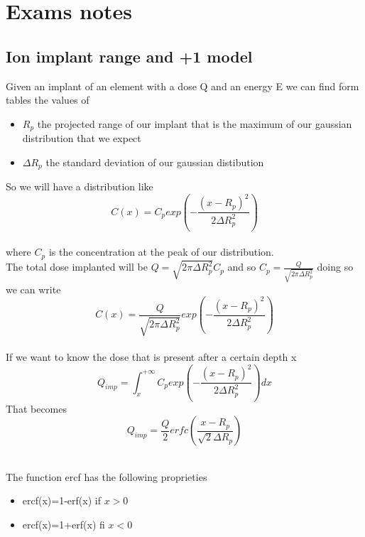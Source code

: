 \chapter{Exams notes}


\section{Ion implant range and +1 model}

Given an implant of an element with a dose Q and an energy E we can find form tables the values of 
    \begin{itemize}
    \item $R_p$ the projected range of our implant that is the maximum of our gaussian distribution that we expect
    \item $\Delta R_p$ the standard deviation of our gaussian distibution
    \end{itemize}
So we will have a distribution like 
\begin{equation}
C(x)=C_p exp\left(-\frac{(x-R_p)^2}{2\Delta R_p^2}\right)
\end{equation}
\\
where $C_p$ is the concentration at the peak of our distribution.\\
The total dose implanted will be $Q=\sqrt{2\pi\Delta R_p^2} C_p$ and so $C_p=\frac{Q}{\sqrt{2\pi\Delta R_p^2}}$ doing so we can write
\begin{equation}
C(x)=\frac{Q}{\sqrt{2\pi\Delta R_p^2}}exp\left(-\frac{(x-R_p)^2}{2\Delta R_p^2}\right)
\end{equation}
\\

If we want to know the dose that is present after a certain depth x
\begin{equation}
Q_{imp}=\int_x^{+\infty}C_p exp\left(-\frac{(x-R_p)^2}{2\Delta R_p^2}\right) dx
\end{equation}
That becomes 
\begin{equation}
Q_{imp}=\frac{Q}{2}erfc\left(\frac{x-R_p}{\sqrt{2}\Delta R_p}\right)
\end{equation}
\\
\vspace{5mm}

The function ercf has the following proprieties 
\begin{itemize}
\item ercf(x)=1-erf(x) if $x>0$
\item ercf(x)=1+erf(x) fi $x<0$
\end{itemize}

